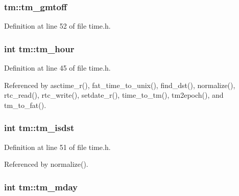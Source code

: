 \subsubsection[{\texorpdfstring{tm\+\_\+gmtoff}{tm_gmtoff}}]{ tm\+::tm\+\_\+gmtoff}\hypertarget{structtm_a6b7d1fb16f21197ea027e364e2812c3d}{}\label{structtm_a6b7d1fb16f21197ea027e364e2812c3d}


Definition at line 52 of file time.\+h.

\subsubsection[{\texorpdfstring{tm\+\_\+hour}{tm_hour}}]{\setlength{\rightskip}{0pt plus 5cm}int tm\+::tm\+\_\+hour}\hypertarget{structtm_a3e7ca4e37f1abcaf56b8a916c38eb9fe}{}\label{structtm_a3e7ca4e37f1abcaf56b8a916c38eb9fe}


Definition at line 45 of file time.\+h.



Referenced by asctime\+\_\+r(), fat\+\_\+time\+\_\+to\+\_\+unix(), find\+\_\+dst(), normalize(), rtc\+\_\+read(), rtc\+\_\+write(), setdate\+\_\+r(), time\+\_\+to\+\_\+tm(), tm2epoch(), and tm\+\_\+to\+\_\+fat().

\subsubsection[{\texorpdfstring{tm\+\_\+isdst}{tm_isdst}}]{\setlength{\rightskip}{0pt plus 5cm}int tm\+::tm\+\_\+isdst}\hypertarget{structtm_a5645ca0580c8ab2c24f6c2965d9c9f9c}{}\label{structtm_a5645ca0580c8ab2c24f6c2965d9c9f9c}


Definition at line 51 of file time.\+h.



Referenced by normalize().

\subsubsection[{\texorpdfstring{tm\+\_\+mday}{tm_mday}}]{\setlength{\rightskip}{0pt plus 5cm}int tm\+::tm\+\_\+mday}\hypertarget{structtm_ab8d8904bad43b0c8b96e61941c5b5310}{}\label{structtm_ab8d8904bad43b0c8b96e61941c5b5310}


